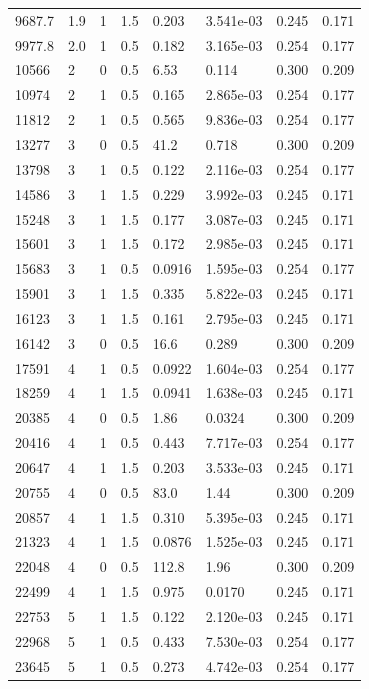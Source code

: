 \documentclass[preview]{standalone}
\begin{document}
{{\begin{tabular}{L{1.2cm}C{1.2cm} C{0.3cm}C{0.5cm} C{1.4cm}C{1.4cm} C{1.4cm}C{1.4cm}}
  9687.7  &   1.9  & 1     & 1.5 &  0.203  & 3.541e-03  & 0.245 &  0.171   \\ 
  9977.8  &   2.0  & 1     & 0.5 &  0.182  & 3.165e-03  & 0.254 &  0.177   \\ 
  10566  &     2  & 0     & 0.5 &  6.53  & 0.114  & 0.300 &  0.209   \\ 
  10974  &     2  & 1     & 0.5 &  0.165  & 2.865e-03  & 0.254 &  0.177   \\ 
  11812  &     2  & 1     & 0.5 &  0.565  & 9.836e-03  & 0.254 &  0.177   \\ 
  13277  &     3  & 0     & 0.5 &  41.2  & 0.718  & 0.300 &  0.209   \\ 
  13798  &     3  & 1     & 0.5 &  0.122  & 2.116e-03  & 0.254 &  0.177   \\ 
  14586  &     3  & 1     & 1.5 &  0.229  & 3.992e-03  & 0.245 &  0.171   \\ 
  15248  &     3  & 1     & 1.5 &  0.177  & 3.087e-03  & 0.245 &  0.171   \\ 
  15601  &     3  & 1     & 1.5 &  0.172  & 2.985e-03  & 0.245 &  0.171   \\ 
  15683  &     3  & 1     & 0.5 &  0.0916  & 1.595e-03  & 0.254 &  0.177   \\ 
  15901  &     3  & 1     & 1.5 &  0.335  & 5.822e-03  & 0.245 &  0.171   \\ 
  16123  &     3  & 1     & 1.5 &  0.161  & 2.795e-03  & 0.245 &  0.171   \\ 
  16142  &     3  & 0     & 0.5 &  16.6  & 0.289  & 0.300 &  0.209   \\ 
  17591  &     4  & 1     & 0.5 &  0.0922  & 1.604e-03  & 0.254 &  0.177   \\ 
  18259  &     4  & 1     & 1.5 &  0.0941  & 1.638e-03  & 0.245 &  0.171   \\ 
  20385  &     4  & 0     & 0.5 &  1.86  & 0.0324  & 0.300 &  0.209   \\ 
  20416  &     4  & 1     & 0.5 &  0.443  & 7.717e-03  & 0.254 &  0.177   \\ 
  20647  &     4  & 1     & 1.5 &  0.203  & 3.533e-03  & 0.245 &  0.171   \\ 
  20755  &     4  & 0     & 0.5 &  83.0  & 1.44  & 0.300 &  0.209   \\ 
  20857  &     4  & 1     & 1.5 &  0.310  & 5.395e-03  & 0.245 &  0.171   \\ 
  21323  &     4  & 1     & 1.5 &  0.0876  & 1.525e-03  & 0.245 &  0.171   \\ 
  22048  &     4  & 0     & 0.5 &  112.8  & 1.96  & 0.300 &  0.209   \\ 
  22499  &     4  & 1     & 1.5 &  0.975  & 0.0170  & 0.245 &  0.171   \\ 
  22753  &     5  & 1     & 1.5 &  0.122  & 2.120e-03  & 0.245 &  0.171   \\ 
  22968  &     5  & 1     & 0.5 &  0.433  & 7.530e-03  & 0.254 &  0.177   \\ 
  23645  &     5  & 1     & 0.5 &  0.273  & 4.742e-03  & 0.254 &  0.177   \\ 
\hline 
\end{tabular} 

}}
\end{document}
